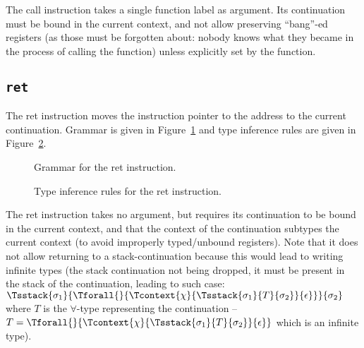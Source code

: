 The {\Iformat call} instruction takes a single function label as argument.
Its continuation must be bound in the current context, and not allow preserving ``bang''-ed registers (as those must be forgotten about: nobody knows what they became in the process of calling the function) unless explicitly set by the function.

\subsection{\texttt{ret}}\label{subsec:nstar-instructionset-terminal-ret}

The {\Iformat ret} instruction moves the instruction pointer to the address to the current continuation.
Grammar is given in Figure~\ref{fig:nstar-instructionset-terminal-ret-grammar} and type inference rules are given in Figure~\ref{fig:nstar-instructionset-terminal-ret-typerules}.

\begin{figure}[H]
	\centering


	\caption{Grammar for the {\Iformat ret} instruction.}
	\label{fig:nstar-instructionset-terminal-ret-grammar}
\end{figure}

\begin{figure}[H]
	\centering


	\caption{Type inference rules for the {\Iformat ret} instruction.}
	\label{fig:nstar-instructionset-terminal-ret-typerules}
\end{figure}

The {\Iformat ret} instruction takes no argument, but requires its continuation to be bound in the current context, and that the context of the continuation subtypes the current context (to avoid improperly typed/unbound registers).
Note that it does not allow returning to a stack-continuation because this would lead to writing infinite types (the stack continuation not being dropped, it must be present in the stack of the continuation, leading to such case: $\Tsstack{\sigma_1}{\Tforall{}{\Tcontext{\chi}{\Tsstack{\sigma_1}{T}{\sigma_2}}{\epsilon}}}{\sigma_2}$ where $T$ is the $\forall$-type representing the continuation -- $T = \Tforall{}{\Tcontext{\chi}{\Tsstack{\sigma_1}{T}{\sigma_2}}{\epsilon}}$ which is an infinite type).

